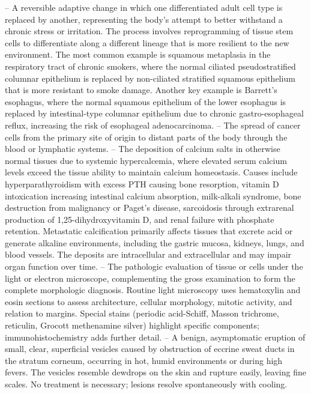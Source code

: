 -- A reversible adaptive change in which one differentiated adult cell type is replaced by another, representing the body's attempt to better withstand a chronic stress or irritation. The process involves reprogramming of tissue stem cells to differentiate along a different lineage that is more resilient to the new environment. The most common example is squamous metaplasia in the respiratory tract of chronic smokers, where the normal ciliated pseudostratified columnar epithelium is replaced by non-ciliated stratified squamous epithelium that is more resistant to smoke damage. Another key example is Barrett's esophagus, where the normal squamous epithelium of the lower esophagus is replaced by intestinal-type columnar epithelium due to chronic gastro-esophageal reflux, increasing the risk of esophageal adenocarcinoma.
-- The spread of cancer cells from the primary site of origin to distant parts of the body through the blood or lymphatic systems.
-- The deposition of calcium salts in otherwise normal tissues due to systemic hypercalcemia, where elevated serum calcium levels exceed the tissue ability to maintain calcium homeostasis. Causes include hyperparathyroidism with excess PTH causing bone resorption, vitamin D intoxication increasing intestinal calcium absorption, milk-alkali syndrome, bone destruction from malignancy or Paget's disease, sarcoidosis through extrarenal production of 1,25-dihydroxyvitamin D, and renal failure with phosphate retention. Metastatic calcification primarily affects tissues that excrete acid or generate alkaline environments, including the gastric mucosa, kidneys, lungs, and blood vessels. The deposits are intracellular and extracellular and may impair organ function over time.
-- The pathologic evaluation of tissue or cells under the light or electron microscope, complementing the gross examination to form the complete morphologic diagnosis. Routine light microscopy uses hematoxylin and eosin sections to assess architecture, cellular morphology, mitotic activity, and relation to margins. Special stains (periodic acid-Schiff, Masson trichrome, reticulin, Grocott methenamine silver) highlight specific components; immunohistochemistry adds further detail.
-- A benign, asymptomatic eruption of small, clear, superficial vesicles caused by obstruction of eccrine sweat ducts in the stratum corneum, occurring in hot, humid environments or during high fevers. The vesicles resemble dewdrops on the skin and rupture easily, leaving fine scales. No treatment is necessary; lesions resolve spontaneously with cooling.
